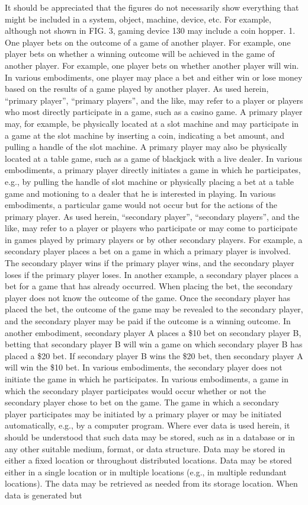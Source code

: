 \documentclass[11pt,a4paper]{article}
\begin{document}
It should be appreciated that the figures do not necessarily show everything that might be included in a system, object, machine, device, etc. For example, although not shown in FIG. 3, gaming device 130 may include a coin hopper. 1. One player bets on the outcome of a game of another player. For example, one player bets on whether a winning outcome will be achieved in the game of another player. For example, one player bets on whether another player will win. In various embodiments, one player may place a bet and either win or lose money based on the results of a game played by another player. As used herein, “primary player”, “primary players”, and the like, may refer to a player or players who most directly participate in a game, such as a casino game. A primary player may, for example, be physically located at a slot machine and may participate in a game at the slot machine by inserting a coin, indicating a bet amount, and pulling a handle of the slot machine. A primary player may also be physically located at a table game, such as a game of blackjack with a live dealer. In various embodiments, a primary player directly initiates a game in which he participates, e.g., by pulling the handle of slot machine or physically placing a bet at a table game and motioning to a dealer that he is interested in playing. In various embodiments, a particular game would not occur but for the actions of the primary player. As used herein, “secondary player”, “secondary players”, and the like, may refer to a player or players who participate or may come to participate in games played by primary players or by other secondary players. For example, a secondary player places a bet on a game in which a primary player is involved. The secondary player wins if the primary player wins, and the secondary player loses if the primary player loses. In another example, a secondary player places a bet for a game that has already occurred. When placing the bet, the secondary player does not know the outcome of the game. Once the secondary player has placed the bet, the outcome of the game may be revealed to the secondary player, and the secondary player may be paid if the outcome is a winning outcome. In another embodiment, secondary player A places a \$10 bet on secondary player B, betting that secondary player B will win a game on which secondary player B has placed a \$20 bet. If secondary player B wins the \$20 bet, then secondary player A will win the \$10 bet. In various embodiments, the secondary player does not initiate the game in which he participates. In various embodiments, a game in which the secondary player participates would occur whether or not the secondary player chose to bet on the game. The game in which a secondary player participates may be initiated by a primary player or may be initiated automatically, e.g., by a computer program. Where ever data is used herein, it should be understood that such data may be stored, such as in a database or in any other suitable medium, format, or data structure. Data may be stored in either a fixed location or throughout distributed locations. Data may be stored either in a single location or in multiple locations (e.g., in multiple redundant locations). The data may be retrieved as needed from its storage location. When data is generated but 
\end{document}
